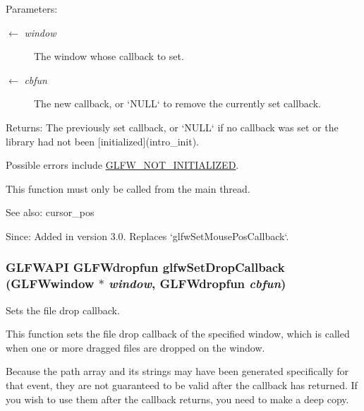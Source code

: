 \begin{Desc}
\item[Parameters:]
\begin{description}
\item[\mbox{$\leftarrow$} {\em window}]The window whose callback to set. \item[\mbox{$\leftarrow$} {\em cbfun}]The new callback, or `NULL` to remove the currently set callback. \end{description}
\end{Desc}
\begin{Desc}
\item[Returns:]The previously set callback, or `NULL` if no callback was set or the library had not been \mbox{[}initialized\mbox{]}(intro\_\-init).\end{Desc}
Possible errors include \hyperlink{group__errors_g2374ee02c177f12e1fa76ff3ed15e14a}{GLFW\_\-NOT\_\-INITIALIZED}.

This function must only be called from the main thread.

\begin{Desc}
\item[See also:]cursor\_\-pos\end{Desc}
\begin{Desc}
\item[Since:]Added in version 3.0. Replaces `glfwSetMousePosCallback`. \end{Desc}
\hypertarget{group__input_gd4fc40df63a5d0441ab06de9a585cc04}{
\subsubsection[glfwSetDropCallback]{\setlength{\rightskip}{0pt plus 5cm}GLFWAPI {\bf GLFWdropfun} glfwSetDropCallback ({\bf GLFWwindow} $\ast$ {\em window}, \/  {\bf GLFWdropfun} {\em cbfun})}}
\label{group__input_gd4fc40df63a5d0441ab06de9a585cc04}


Sets the file drop callback. 

This function sets the file drop callback of the specified window, which is called when one or more dragged files are dropped on the window.

Because the path array and its strings may have been generated specifically for that event, they are not guaranteed to be valid after the callback has returned. If you wish to use them after the callback returns, you need to make a deep copy.

